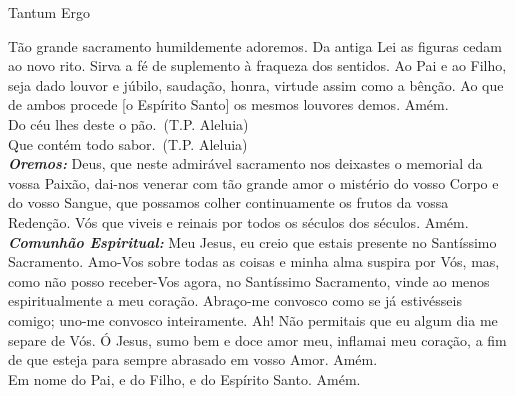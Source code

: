 \newpage
\begin{center}
    Tantum Ergo
\end{center}
\begin{flushleft}
    Tão grande sacramento humildemente adoremos. Da antiga Lei as figuras cedam ao novo rito. Sirva a fé de suplemento à fraqueza dos sentidos. Ao Pai e ao Filho, seja dado louvor e júbilo, saudação, honra, virtude assim como a bênção. Ao que de ambos procede [o Espírito Santo] os mesmos louvores demos. Amém.
    \vspace{.2cm} \\
    \VbarRed{} Do céu lhes deste o pão.\ (\textcolor{VioletRed2}{T.P.} Aleluia) \\
    \RbarRed{} Que contém todo sabor.\ (\textcolor{VioletRed2}{T.P.} Aleluia)
    \vspace{.2cm} \\
    \textbf{\textit{Oremos:}} Deus, que neste admirável sacramento nos deixastes o memorial da vossa Paixão, dai-nos venerar com tão grande amor o mistério do vosso Corpo e do vosso Sangue, que possamos colher continuamente os frutos da vossa Redenção. Vós que viveis e reinais por todos os séculos dos séculos. Amém.
    \vspace{.2cm} \\
    \textbf{\textit{Comunhão Espiritual:}} Meu Jesus, eu creio que estais presente no Santíssimo Sacramento. Amo-Vos sobre todas as coisas e minha alma suspira por Vós, mas, como não posso receber-Vos agora, no Santíssimo Sacramento, vinde ao menos espiritualmente a meu coração. Abraço-me convosco como se já estivésseis comigo; uno-me convosco inteiramente. Ah! Não permitais que eu algum dia me separe de Vós. Ó Jesus, sumo bem e doce amor meu, inflamai meu coração, a fim de que esteja para sempre abrasado em vosso Amor. Amém.
    \vspace{.2cm} \\
    Em nome do Pai, \grecrossRed{} e do Filho, e do Espírito Santo. Amém.
\end{flushleft}
